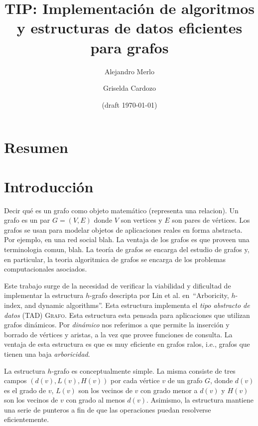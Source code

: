 \documentclass[a4paper,12pt]{article}
\newcommand{\Grafo}{\textsc{Grafo}\xspace}
\begin{document}
\title{TIP:  Implementación de algoritmos y estructuras de datos eficientes para grafos}

\author{Alejandro Merlo \and Griselda Cardozo}
\date{(draft \today)} %

\maketitle

\tableofcontents

\section{Resumen}
\label{sec:resumen}


\section{Introducción}
\label{sec:introduccion}

Decir qué es un grafo como objeto matemático (representa una relacion).  Un grafo es un par $G = (V, E)$ donde $V$ son vertices y $E$ son pares de vértices.  Los grafos se usan para modelar objetos de aplicaciones reales en forma abstracta.  Por ejemplo, en una red social blah.  La ventaja de los grafos es que proveen una terminologia comun, blah.  La teoría de grafos se encarga del estudio de grafos y, en particular, la teoria algoritmica de grafos se encarga de los problemas computacionales asociados.


Este trabajo surge de la necesidad de verificar la viabilidad y dificultad de implementar la estructura $h$-grafo descripta por Lin et al. en~\cite{}``Arboricity, $h$-index, and dynamic algorithms''.   Esta estructura implementa el \emph{tipo abstracto de datos} (TAD) \Grafo.  Esta estructura esta pensada para aplicaciones que utilizan grafos dinámicos.  Por \emph{dinámico} nos referimos a que permite la inserción y borrado de vértices y aristas, a la vez que provee funciones de consulta.  La ventaja de esta estructura es que es muy eficiente en grafos ralos, i.e., grafos que tienen una baja \emph{arboricidad}.  

La estructura $h$-grafo es conceptualmente simple.  La misma consiste de tres campos $(d(v), L(v), H(v))$ por cada vértice $v$ de un grafo $G$, donde $d(v)$ es el grado de $v$, $L(v)$ son los vecinos de $v$ con grado menor a $d(v)$ y $H(v)$ son los vecinos de $v$ con grado al menos $d(v)$.  Asimismo, la estructura mantiene una serie de punteros a fin de que las operaciones puedan resolverse eficientemente.  
\end{document}
